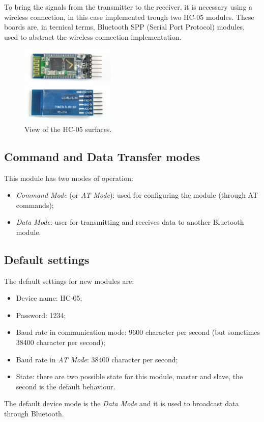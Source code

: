 To bring the signals from the transmitter to the receiver, it is necessary using a wireless connection, in this case
implemented trough two HC-05 modules. These boards are, in tecnical terms, Bluetooth SPP (Serial Port Protocol) modules, used to abstract the wireless connection implementation.\\

\begin{figure}[H]
	\hspace*{0.3 \textwidth}\includegraphics[width= 0.4\textwidth]
	{files/images/hc05_view}
	\caption{View of the HC-05 surfaces.}
\end{figure}

\subsection{Command and Data Transfer modes}
This module has two modes of operation:
\begin{itemize}
	\item \textit{Command Mode} (or \textit{AT Mode}): used for configuring the module (through AT commands);
	\item \textit{Data Mode}: user for transmitting and receives data to another Bluetooth module.
\end{itemize}

\subsection{Default settings}
The default settings for new modules are:
\begin{itemize}
	\item Device name: HC-05;
	\item Password: 1234;
	\item Baud rate in communication mode: 9600 character per second (but sometimes 38400 character per second);
	\item Baud rate in \textit{AT Mode}: 38400 character per second;
	\item State: there are two possible state for this module, master and slave, the second is the default behaviour.
\end{itemize}
The default device mode is the \textit{Data Mode} and it is used to broadcast data through Bluetooth.\\

